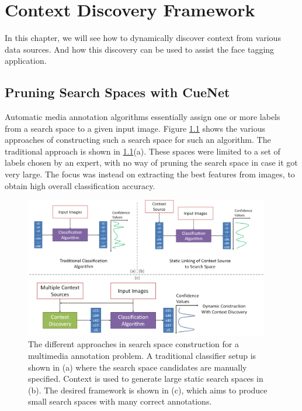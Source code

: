 \chapter{Context Discovery Framework}

In this chapter, we will see how to dynamically discover context from various data sources. And how this discovery can be used to assist the face tagging application.


\section{Pruning Search Spaces with CueNet}

Automatic media annotation algorithms essentially assign one or more labels from a search space to a given input image. Figure \ref{fig:with-without-cuenet} shows the various approaches of constructing such a search space for such an algorithm. The traditional approach is shown in \ref{fig:with-without-cuenet}(a). These spaces were limited to a set of labels chosen by an expert, with no way of pruning the search space in case it got very large. The focus was instead on extracting the best features from images, to obtain high overall classification accuracy\cite{turk1991eigenfaces}.

\begin{figure}[t]
\centering
\includegraphics[width=0.95\textwidth]{media/with-without-cuenet-2.png}
\caption{The different approaches in search space construction for a multimedia annotation problem. A traditional classifier setup is shown in (a) where the search space candidates are manually specified. Context is used to generate large static search spaces in (b). The desired framework is shown in (c), which aims to produce small search spaces with many correct annotations.}
\label{fig:with-without-cuenet}
\end{figure}

